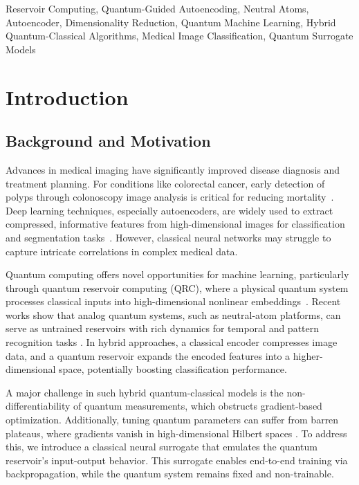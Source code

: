 \documentclass[conference]{IEEEtran}
\begin{document}
\begin{IEEEkeywords}
Reservoir Computing, Quantum-Guided Autoencoding,
Neutral Atoms, Autoencoder, Dimensionality Reduction, 
Quantum Machine Learning, Hybrid Quantum-Classical Algorithms, 
Medical Image Classification, Quantum Surrogate Models
\end{IEEEkeywords}

\section{Introduction}

\subsection{Background and Motivation}
Advances in medical imaging have significantly improved 
disease diagnosis and treatment planning. For conditions 
like colorectal cancer, early detection of polyps through 
colonoscopy image analysis is critical for reducing mortality~\cite{estevaGuideDeepLearning2019a}. 
Deep learning techniques, especially autoencoders, are widely 
used to extract compressed, informative features from 
high-dimensional images for classification and segmentation 
tasks~\cite{bengioLearningDeepArchitecturesa}. However, classical neural networks may struggle 
to capture intricate correlations in complex medical data.

Quantum computing offers novel opportunities 
for machine learning, particularly through quantum reservoir 
computing (QRC), where a physical quantum system processes 
classical inputs into high-dimensional nonlinear embeddings~\cite{tanakaRecentAdvancesPhysical2019,fujiiHarnessingDisorderedQuantum2017}. Recent works show that analog quantum systems, 
such as neutral-atom platforms, can serve as untrained 
reservoirs with rich dynamics for temporal and pattern 
recognition tasks \cite{domingoOptimalQuantumReservoir2022,kornjavcaLargescaleQuantumReservoir2024}. 
In hybrid approaches, a classical encoder compresses 
image data, and a quantum reservoir expands 
the encoded features into a higher-dimensional space, 
potentially boosting classification performance.

A major challenge in such hybrid quantum-classical 
models is the non-differentiability of quantum measurements, 
which obstructs gradient-based optimization. Additionally, 
tuning quantum parameters can suffer from barren plateaus, where 
gradients vanish in high-dimensional Hilbert spaces \cite{mccleanBarrenPlateausQuantum2018}. 
To address this, we introduce a classical neural surrogate 
that emulates the quantum reservoir's input-output behavior. 
This surrogate enables end-to-end training via backpropagation, 
while the quantum system remains fixed and non-trainable.
\end{document}
